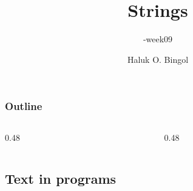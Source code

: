 \documentclass[aspectratio=169,10pt,compress]{beamer}
\title[\cisOOO-week09-String]{
	Strings
}
\subtitle{
	\cisOOO-week09
}
\author[Bingol]{
	Haluk O. Bingol
}
\institute[FCIS]{
    Faculty of Computer and Information Sciences\\
    Yeditepe University
}
\date{
	{\tiny \hbTimeStamp}
}
\begin{document}




\begin{frame}[t,fragile]
  \titlepage
\end{frame}




\begin{frame}[t,fragile] \frametitle{Outline}
  \begin{columns}[T]
    \begin{column}{0.48\textwidth}
      \tableofcontents[sections={1-7}, hideallsubsections]
    \end{column}
    \begin{column}{0.48\textwidth}
      \tableofcontents[sections={8-14}, hideallsubsections]
    \end{column}
  \end{columns}
\end{frame}


\subsection[Text]{Text in programs}
\end{document}

